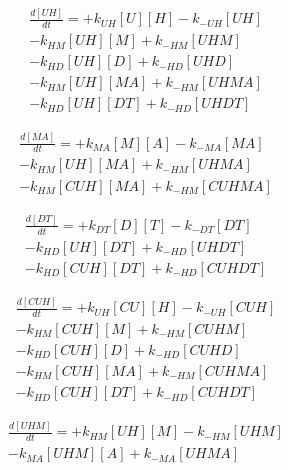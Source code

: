 \begin{equation}
\begin{split}
\frac{d[UH]}{dt} = + k_{UH}[U][H] - k_{-UH}[UH] \\%
                   - k_{HM}[UH][M] + k_{-HM}[UHM] \\%
                   - k_{HD}[UH][D] + k_{-HD}[UHD] \\%
                   - k_{HM}[UH][MA] + k_{-HM}[UHMA] \\%
                   - k_{HD}[UH][DT] + k_{-HD}[UHDT] %
\end{split}
\end{equation}

\begin{equation}
\begin{split}
\frac{d[MA]}{dt} = + k_{MA}[M][A] - k_{-MA}[MA] \\%
                   - k_{HM}[UH][MA] + k_{-HM}[UHMA] \\%
                   - k_{HM}[CUH][MA] + k_{-HM}[CUHMA] %
\end{split}
\end{equation}

\begin{equation}
\begin{split}
\frac{d[DT]}{dt} = + k_{DT}[D][T] - k_{-DT}[DT] \\%
                   - k_{HD}[UH][DT] + k_{-HD}[UHDT] \\%
                   - k_{HD}[CUH][DT] + k_{-HD}[CUHDT] %
\end{split}               
\end{equation}

\begin{equation}
\begin{split}
\frac{d[CUH]}{dt} = + k_{UH}[CU][H] - k_{-UH}[CUH] \\%
                    - k_{HM}[CUH][M] + k_{-HM}[CUHM] \\%
                    - k_{HD}[CUH][D] + k_{-HD}[CUHD] \\%
                    - k_{HM}[CUH][MA] + k_{-HM}[CUHMA] \\%
                    - k_{HD}[CUH][DT] + k_{-HD}[CUHDT] %
\end{split}
\end{equation}

\begin{equation}
\begin{split}
\frac{d[UHM]}{dt} = + k_{HM}[UH][M] - k_{-HM}[UHM] \\%
                    - k_{MA}[UHM][A] + k_{-MA}[UHMA] %
\end{split}
\end{equation}

